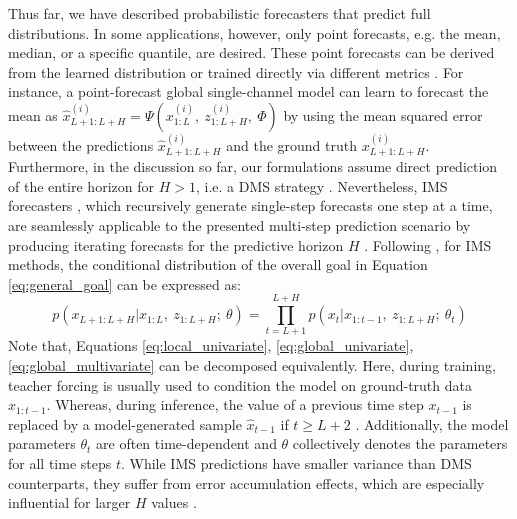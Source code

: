 \documentclass[a4paper,oneside,bibliography=totoc]{scrbook}
\begin{document}
\noindent
Thus far, we have described probabilistic forecasters that predict full distributions. 
In some applications, however, only point forecasts, e.g. the mean, median, or a specific quantile, are desired. 
These point forecasts can be derived from the learned distribution or trained directly via different metrics \cite{kolassa_why_2020}.  
For instance, a point-forecast global single-channel model can learn to forecast the mean as $\hat{x}^{(i)}_{L+1:L+H}=\Psi(x^{(i)}_{1:L},\ z^{(i)}_{1:L+H},\ \Phi)$ by using the mean squared error between the predictions $\hat{x}^{(i)}_{L+1:L+H}$ and the ground truth $x^{(i)}_{L+1:L+H}$.
Furthermore, in the discussion so far, our formulations assume direct prediction of the entire horizon for $H>1$, i.e. a DMS strategy \cite{chevillon_direct_2007}. 
Nevertheless, IMS forecasters \cite{taieb_recursive_2012}, which recursively generate single-step forecasts one step at a time, are seamlessly applicable to the presented multi-step prediction scenario by producing iterating forecasts for the predictive horizon $H$ \cite{benidis_deep_2022}.
Following \citet{graves_generating_2014}, for IMS methods, the conditional distribution of the overall goal in Equation \ref{eq:general_goal} can be expressed as:
\begin{equation}
    p(x_{L+1:L+H}|x_{1:L},\ z_{1:L+H};\ \theta) = \prod_{t=L+1}^{L+H} p(x_{t}|x_{1:t-1},\ z_{1:L+H};\ \theta_t)
    \label{eq:IMS}
\end{equation}
Note that, Equations \ref{eq:local_univariate}, \ref{eq:global_univariate}, \ref{eq:global_multivariate} can be decomposed equivalently.
Here, during training, teacher forcing \cite{williams_learning_1989} is usually used to condition the model on ground-truth data $x_{1:t-1}$.
Whereas, during inference, the value of a previous time step $x_{t-1}$ is replaced by a model-generated sample $\hat{x}_{t-1}$ if $t\geq L+2$ \cite{salinas_deepar_2020}. Additionally, the model parameters $\theta_t$ are often time-dependent and $\theta$ collectively denotes the parameters for all time steps $t$.
While IMS predictions have smaller variance than DMS counterparts, they suffer from error accumulation effects, which are especially influential for larger $H$ values \cite{zeng_are_2023}.
\end{document}
